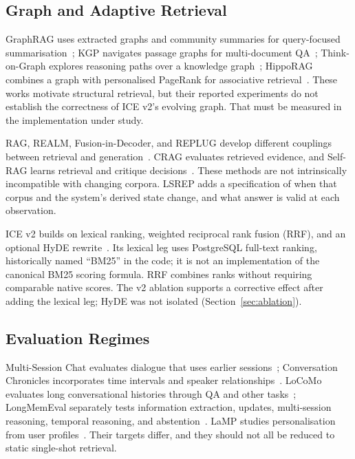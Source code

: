 \documentclass[11pt,a4paper]{article}
\begin{document}
\subsection{Graph and Adaptive Retrieval}
\label{sec:related-kg}\label{sec:related-rag}\label{sec:related-primitives}
GraphRAG uses extracted graphs and community summaries for query-focused summarisation~\citep{edge2024graphrag}; KGP navigates passage graphs for multi-document QA~\citep{wang2023kgp}; Think-on-Graph explores reasoning paths over a knowledge graph~\citep{sun2024tog}; HippoRAG combines a graph with personalised PageRank for associative retrieval~\citep{gutierrez2024hipporag}. These works motivate structural retrieval, but their reported experiments do not establish the correctness of ICE v2's evolving graph. That must be measured in the implementation under study.

RAG, REALM, Fusion-in-Decoder, and REPLUG develop different couplings between retrieval and generation~\citep{lewis2020rag,guu2020realm,izacard2021fid,shi2024replug}. CRAG evaluates retrieved evidence, and Self-RAG learns retrieval and critique decisions~\citep{yan2024crag,asai2024selfrag}. These methods are not intrinsically incompatible with changing corpora. LSREP adds a specification of when that corpus and the system's derived state change, and what answer is valid at each observation.

ICE v2 builds on lexical ranking, weighted reciprocal rank fusion (RRF), and an optional HyDE rewrite~\citep{robertson2009bm25,cormack2009rrf,gao2023hyde}. Its lexical leg uses PostgreSQL full-text ranking, historically named ``BM25'' in the code; it is not an implementation of the canonical BM25 scoring formula. RRF combines ranks without requiring comparable native scores. The v2 ablation supports a corrective effect after adding the lexical leg; HyDE was not isolated (Section~\ref{sec:ablation}).

\subsection{Evaluation Regimes}
\label{sec:related-eval}
Multi-Session Chat evaluates dialogue that uses earlier sessions~\citep{xu2022msc}; Conversation Chronicles incorporates time intervals and speaker relationships~\citep{jang2023chronicles}. LoCoMo evaluates long conversational histories through QA and other tasks~\citep{maharana2024locomo}; LongMemEval separately tests information extraction, updates, multi-session reasoning, temporal reasoning, and abstention~\citep{wu2025longmemeval}. LaMP studies personalisation from user profiles~\citep{salemi2024lamp}. Their targets differ, and they should not all be reduced to static single-shot retrieval.
\end{document}
